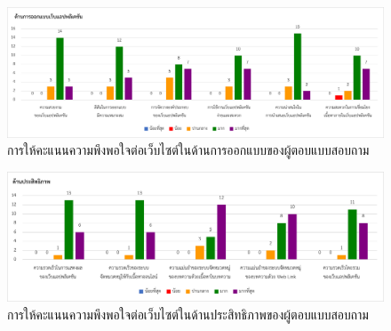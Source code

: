 \documentclass[12pt,oneside,openright,a4paper]{cpe-thai-project}
\begin{document}
 \\
\begin{figure}[!ht]\centering
  \includegraphics[width=\textwidth]{./img/test/design.png}
  \caption{การให้คะแนนความพึงพอใจต่อเว็บไซต์ในด้านการออกแบบของผู้ตอบแบบสอบถาม}\label{fig:user_test_design}
\end{figure}
\begin{figure}[!ht]\centering
  \includegraphics[width=\textwidth]{./img/test/efficient.png}
  \caption{การให้คะแนนความพึงพอใจต่อเว็บไซต์ในด้านประสิทธิภาพของผู้ตอบแบบสอบถาม}\label{fig:user_test_eff}
\end{figure}
\end{document}
